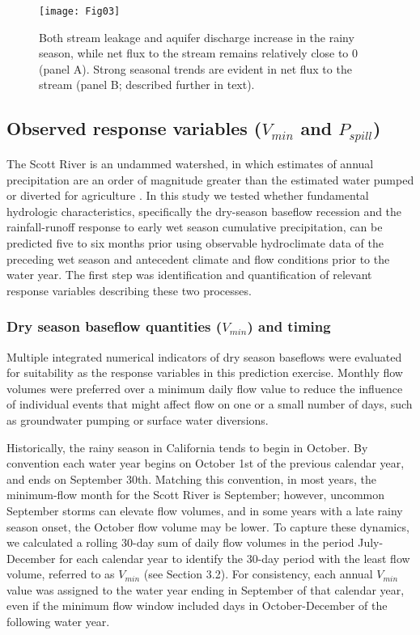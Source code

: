 \documentclass[hess, manuscript]{copernicus}
\begin{document}
\begin{figure}
\texttt{[image: Fig03]} \caption{\label{fig:flow_to_aq_and_stream} Both stream leakage and aquifer discharge increase in the rainy season, while net flux to the stream remains relatively close to 0 (panel A). Strong seasonal trends are evident in net flux to the stream (panel B; described further in text).}\label{fig:flow_to_aq_and_stream}
\end{figure}

\subsection{\texorpdfstring{Observed response variables ($V_{min}$ and
$P_{spill}$)}{Observed response variables (V\_\{min\} and P\_\{spill\})}}

The Scott River is an undammed watershed, in which estimates of annual
precipitation are an order of magnitude greater than the estimated water
pumped or diverted for agriculture \citep{Tolley2019}. In this study we
tested whether fundamental hydrologic characteristics, specifically the
dry-season baseflow recession and the rainfall-runoff response to early
wet season cumulative precipitation, can be predicted five to six months
prior using observable hydroclimate data of the preceding wet season and
antecedent climate and flow conditions prior to the water year. The
first step was identification and quantification of relevant response
variables describing these two processes.

\subsubsection{\texorpdfstring{Dry season baseflow quantities
($V_{min}$) and
timing}{Dry season baseflow quantities (V\_\{min\}) and timing}}

Multiple integrated numerical indicators of dry season baseflows were
evaluated for suitability as the response variables in this prediction
exercise. Monthly flow volumes were preferred over a minimum daily flow
value to reduce the influence of individual events that might affect
flow on one or a small number of days, such as groundwater pumping or
surface water diversions.

Historically, the rainy season in California tends to begin in October.
By convention each water year begins on October 1st of the previous
calendar year, and ends on September 30th. Matching this convention, in
most years, the minimum-flow month for the Scott River is September;
however, uncommon September storms can elevate flow volumes, and in some
years with a late rainy season onset, the October flow volume may be
lower. To capture these dynamics, we calculated a rolling 30-day sum of
daily flow volumes in the period July-December for each calendar year to
identify the 30-day period with the least flow volume, referred to as
$V_{min}$ (see Section 3.2). For consistency, each annual $V_{min}$
value was assigned to the water year ending in September of that
calendar year, even if the minimum flow window included days in
October-December of the following water year.
\end{document}
